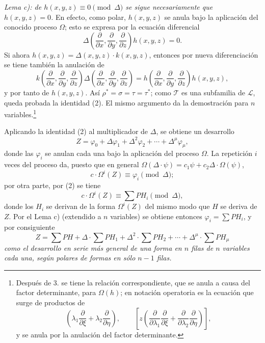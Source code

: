 \documentclass[11pt]{article}
\begin{document}
\emph{Lema c): de $h(x,y,z)\equiv0\pmod{\Delta}$ se sigue necesariamente que $h(x,y,z)=0$.} En efecto, como polar, $h(x,y,z)$ se anula bajo la aplicación del conocido proceso $\Omega$; esto se expresa por la ecuación diferencial
\[
  \Delta\!\left(\frac{\partial}{\partial x},\frac{\partial}{\partial y},\frac{\partial}{\partial z}\right)h(x,y,z)=0.
\]
Si ahora $h(x,y,z)=\Delta(x,y,z)\cdot k(x,y,z)$, entonces por nueva diferenciación se tiene también la anulación de
\[
  k\!\left(\frac{\partial}{\partial x},\frac{\partial}{\partial y},\frac{\partial}{\partial z}\right)
  \Delta\!\left(\frac{\partial}{\partial x},\frac{\partial}{\partial y},\frac{\partial}{\partial z}\right)
  =
  h\!\left(\frac{\partial}{\partial x},\frac{\partial}{\partial y},\frac{\partial}{\partial z}\right)h(x,y,z),
\]
y por tanto de $h(x,y,z)$. Así $\rho^*=\sigma=\tau=\tau^*$; como $\mathcal T$ es una subfamilia de $\mathcal L$, queda probada la identidad (2). El mismo argumento da la demostración para $n$ variables.\footnote{Después de 3. se tiene la relación correspondiente, que se anula a causa del factor determinante, para $\Omega(h)$; en notación operatoria es la ecuación que surge de productos de
\[
 \left(\lambda_1\frac{\partial}{\partial \xi}+\lambda_2\frac{\partial}{\partial \eta}\right),
 \qquad
 \left[z\left(\frac{\partial}{\partial\lambda_1}\frac{\partial}{\partial \xi}
 +\frac{\partial}{\partial\lambda_2}\frac{\partial}{\partial \eta}\right)\right],
\]
y se anula por la anulación del factor determinante.}

Aplicando la identidad (2) al multiplicador de $\Delta$, se obtiene un desarrollo
\[
  Z=\varphi_0+\Delta\varphi_1+\Delta^2\varphi_2+\cdots+\Delta^\mu\varphi_\mu,
\]
donde las $\varphi_i$ se anulan cada una bajo la aplicación del proceso $\Omega$. La repetición $i$ veces del proceso da, puesto que en general $\Omega(\Delta\cdot\psi)=c_1\psi+c_2\Delta\cdot\Omega(\psi)$,
\[
  c\cdot \Omega^i(Z)\equiv\varphi_i\pmod{\Delta};
\]
por otra parte, por (2) se tiene
\[
  c\cdot\Omega^i(Z)\equiv\sum PH_i\pmod{\Delta},
\]
donde los $H_i$ se derivan de la forma $\Omega^i(Z)$ del mismo modo que $H$ se deriva de $Z$. Por el Lema c) (extendido a $n$ variables) se obtiene entonces $\varphi_i=\sum PH_i$, y por consiguiente
\begin{equation}
  Z=\sum PH+\Delta\cdot\sum PH_1+\Delta^2\cdot\sum PH_2+
  \cdots+\Delta^\mu\cdot\sum PH_\mu
\tag{3}
\end{equation}
\emph{como el desarrollo en serie más general de una forma en $n$ filas de $n$ variables cada una, según polares de formas en sólo $n-1$ filas.}
\end{document}
